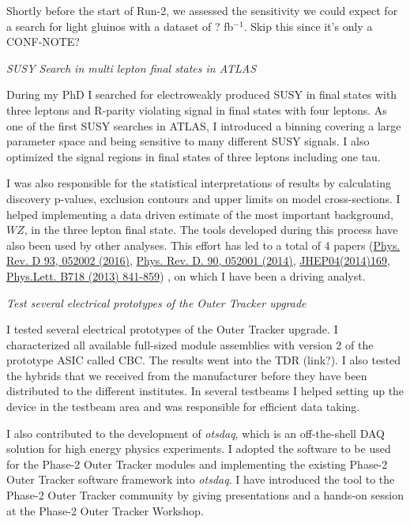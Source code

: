 \documentclass[]{cv} %
\begin{document}
\begin{researchexperience}
Shortly before the start of Run-2, we assessed the sensitivity we could expect
for a search for light gluinos with a dataset of ? fb$^{-1}$. Skip this since
it's only a CONF-NOTE?

\vspace{15pt}
\Large{}
\textit{SUSY Search in multi lepton final states in ATLAS} \\
\normalsize{}

During my PhD I searched for electroweakly produced SUSY in final states with
three leptons and R-parity violating signal in final states with four leptons.
As one of the first SUSY searches in ATLAS, I introduced a binning covering a
large parameter space and being sensitive to many different SUSY signals. I also
optimized the signal regions in final states of three leptons including one tau. 

I was also responsible for the statistical interpretations of results by
calculating discovery p-values, exclusion contours and upper limits on model
cross-sections. I helped implementing a data driven estimate of the most
important background, $WZ$, in the three lepton final state. The tools
developed during this process have also been used by other analyses. This effort
has led to a total of 4 papers
(\href{https://journals.aps.org/prd/abstract/10.1103/PhysRevD.93.052002}
{Phys.  Rev. D 93, 052002 (2016)},
\href{https://journals.aps.org/prd/abstract/10.1103/PhysRevD.90.052001}
{Phys. Rev. D. 90, 052001 (2014)},
\href{https://link.springer.com/article/10.1007\%2FJHEP04\%282014\%29169}
{JHEP04(2014)169},
\href{https://www.sciencedirect.com/science/article/pii/S037026931201204X?via\%3Dihub}
{Phys.Lett. B718 (2013) 841-859})
, on which I have been a driving analyst.

\vspace{15pt}
\Large{}
\textit{Test several electrical prototypes of the Outer Tracker upgrade} \\
\normalsize{}

I tested several electrical prototypes of the Outer Tracker upgrade. I
characterized all available full-sized module assemblies with version 2 of the
prototype ASIC called CBC. The results went into the TDR (link?). I also tested
the hybrids that we received from the manufacturer before they have been
distributed to the different institutes. In several testbeams I helped setting
up the device in the testbeam area and was responsible for efficient data
taking.

I also contributed to the development of \textit{otsdaq}, which is an
off-the-shell DAQ solution for high energy physics experiments. I adopted the
software to be used for the Phase-2 Outer Tracker modules and implementing the
existing Phase-2 Outer Tracker software framework into \textit{otsdaq}. I have
introduced the tool to the Phase-2 Outer Tracker community by giving
presentations and a hands-on session at the Phase-2 Outer Tracker Workshop.


\end{researchexperience}
\end{document}

